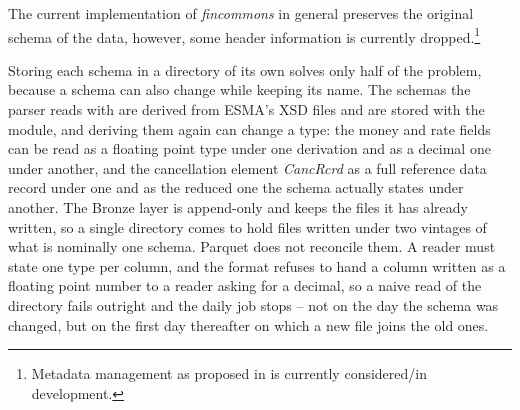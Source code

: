 The current implementation of \emph{fincommons} in general preserves the original schema of the data, however, some header information is currently dropped.\footnote{Metadata management as proposed in \textcite[chapter 6]{Strengholt.2025} is currently considered/in development.}

Storing each schema in a directory of its own solves only half of the problem, because a schema can also change while keeping its name. The schemas the parser reads with are derived from ESMA's XSD files and are stored with the module, and deriving them again can change a type: the money and rate fields can be read as a floating point type under one derivation and as a decimal one under another, and the cancellation element \emph{CancRcrd} as a full reference data record under one and as the reduced one the schema actually states under another. The Bronze layer is append-only and keeps the files it has already written, so a single directory comes to hold files written under two vintages of what is nominally one schema. Parquet does not reconcile them. A reader must state one type per column, and the format refuses to hand a column written as a floating point number to a reader asking for a decimal, so a naive read of the directory fails outright and the daily job stops -- not on the day the schema was changed, but on the first day thereafter on which a new file joins the old ones.

